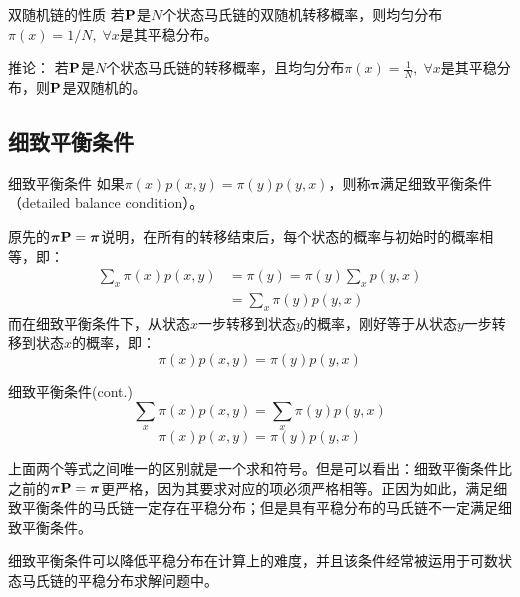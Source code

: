 \documentclass[t]{beamer}
\begin{document}
\begin{frame}{双随机链的性质}
    若$\bf P$是$N$个状态马氏链的双随机转移概率，则均匀分布$\pi(x)=1/N,\;\forall x$是其平稳分布。

    \begin{block}{推论：}
        若$\bf P$是$N$个状态马氏链的转移概率，且均匀分布$\displaystyle\pi(x)=\frac{1}{N},\;\forall x$是其平稳分布，则$\bf P$是双随机的。
    \end{block}
\end{frame}

\subsection{细致平衡条件}
\begin{frame}{细致平衡条件}
    如果$\pi(x)p(x,y)=\pi(y)p(y,x)$，则称$\bm{\pi}$满足细致平衡条件（detailed balance condition）。

    原先的$\bm{\pi}{\bf P}=\bm{\pi}$说明，在所有的转移结束后，每个状态的概率与初始时的概率相等，即：
\begin{equation*}
\begin{split}
{\sum_x \pi(x)p(x,y)}&=\pi(y)={\pi(y)\sum_{x}p(y,x)} \\
&=\sum_{x}\pi(y)p(y,x)
\end{split}
\end{equation*}
而在细致平衡条件下，从状态$x${一步}转移到状态$y$的概率，刚好等于从状态$y${一步}转移到状态$x$的概率，即：
\begin{equation*}
\pi(x)p(x,y)=\pi(y)p(y,x)
\end{equation*}
\end{frame}



\begin{frame}{细致平衡条件(cont.)}
\[\sum_x \pi(x)p(x,y)=\sum_{x}\pi(y)p(y,x) \]
\[\pi(x)p(x,y) = \pi(y)p(y,x) \]

上面两个等式之间唯一的区别就是一个求和符号。但是可以看出：细致平衡条件比之前的$\bm{\pi}{\bf P}=\bm{\pi}$更严格，因为其要求对应的项必须严格相等。正因为如此，满足细致平衡条件的马氏链一定存在平稳分布；但是具有平稳分布的马氏链不一定满足细致平衡条件。

细致平衡条件可以降低平稳分布在计算上的难度，并且该条件经常被运用于可数状态马氏链的平稳分布求解问题中。
\end{frame}
\end{document}
